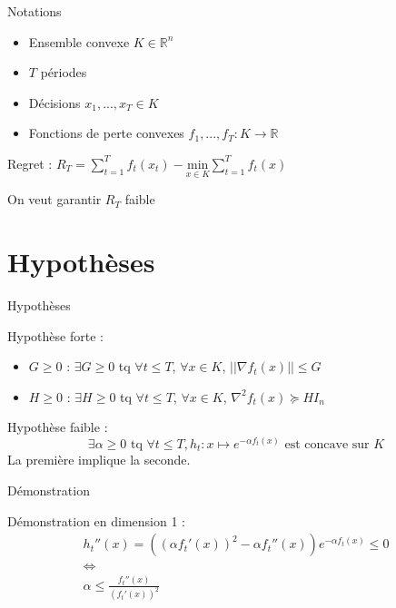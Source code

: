 \documentclass[aspectratio=1610,17pt,utf8]{beamer}
\newcommand{\R}{\mathbb{R}}
\theoremstyle{definition}
\begin{document}
\begin{frame}{Notations}

\begin{itemize}
    \item Ensemble convexe $K \in \R^n$
    \item $T$ périodes
    \item Décisions $x_1, ..., x_T \in K$
    \item Fonctions de perte convexes $f_1, ..., f_T : K \rightarrow \R$
\end{itemize}

Regret : $R_T = \sum\limits_{t=1}^T f_t(x_t) - \underset{x \in K}{\text{min}} \sum\limits_{t=1}^T f_t(x)$

On veut garantir $R_T$ faible

\end{frame}

\section{Hypothèses}

\begin{frame}{Hypothèses}

Hypothèse forte :
\begin{itemize}
    \item $G \geq 0$ : $\exists G \geq 0$ tq $\forall t \leq T$, $\forall x \in K$, $||\nabla f_t(x)|| \leq G$
    \item $H \geq 0$ : $\exists H \geq 0$ tq $\forall t \leq T$, $\forall x \in K$, $\nabla^2 f_t(x) \succeq H I_n$
\end{itemize}

Hypothèse faible :
\[ \exists \alpha \geq 0 \text{ tq } \forall t \leq T, h_t : x \mapsto e^{-\alpha f_t(x)} \text{ est concave sur } K \]
La première implique la seconde.

\end{frame}

\begin{frame}{Démonstration}

Démonstration en dimension 1 :
\[
\begin{array}{c}
h_t''(x) = ((\alpha f_t'(x))^2 - \alpha f_t''(x))e^{-\alpha f_t(x)} \leq 0 \\
\Longleftrightarrow \\
\alpha \leq \frac{f_t''(x)}{(f_t'(x))^2}
\end{array}
\]

\end{frame}
\end{document}
